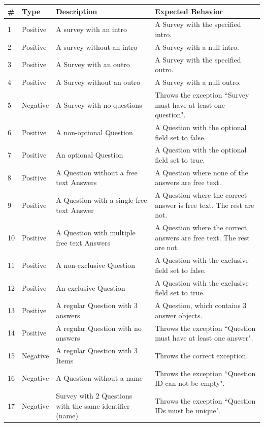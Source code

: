 \documentclass[runningheads,a4paper]{llncs}
\begin{document}
\newpage
\begin{table}[htb]
\begin{tabular}{|l|l|p{5cm}|p{5cm}|}
\hline
\textbf{\#} & \textbf{Type} & \textbf{Description} & \textbf{Expected Behavior}\\ \hline
1 & Positive & A survey with an intro & A Survey with the specified intro. \\ \hline
2 & Positive & A survey without an intro & A Survey with a null intro. \\ \hline
3 & Positive & A Survey with an outro & A Survey with the specified outro.\\ \hline
4 & Positive & A Survey without an outro & A Survey with a null outro. \\ \hline
5 & Negative & A Survey with no questions & Throws the exception ``Survey must have at least one question". \\ \hline
6 & Positive & A non-optional Question & A Question with the optional field set to false.\\ \hline
7 & Positive & An optional Question & A Question with the optional field set to true.\\ \hline
8 & Positive & A Question without a free text Answers & A Question where none of the answers are free text.\\ \hline
9 & Positive & A Question with a single free text Answer & A Question where the correct answer is free text. The rest are not.\\ \hline
10 & Positive & A Question with multiple free text Answers & A Question where the correct answers are free text. The rest are not.\\ \hline
11 & Positive & A non-exclusive Question & A Question with the exclusive field set to false.\\ \hline
12 & Positive & An exclusive Question & A Question with the exclusive field set to true.\\ \hline
13 & Positive & A regular Question with 3 answers & A Question, which contains 3 answer objects.\\ \hline
14 & Positive & A regular Question with no answers & Throws the exception ``Question must have at least one answer".\\ \hline
15 & Negative & A regular Question with 3 Items & Throws the correct exception.\\ \hline
16 & Negative &  A Question without a name & Throws the exception ``Question ID can not be empty".\\ \hline
17 & Negative & Survey with 2 Questions with the same identifier (name) & Throws the exception ``Question IDs must be unique".\\ \hline

\end{tabular}
\end{table}
\end{document}

